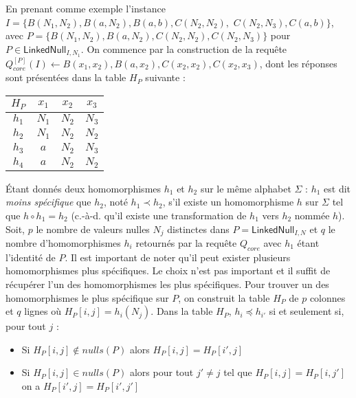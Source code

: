 \begin{example}
	\label{ex:update:core:tableau}
	En prenant comme exemple l'instance $I = \{B(N_1, N_2), B(a, N_2), B(a, b), C(N_2, N_2),$ $C(N_2, N_3), C(a, b)\}$, avec $P = \{B(N_1, N_2), B(a, N_2), C(N_2, N_2), C(N_2, N_3)\}$ pour $P \in \textsf{LinkedNull}_{I,N_1}$.
	On commence par la construction de la requête $Q_{core}^{[P]}(I) \gets B(x_1, x_2), B(a, x_2), C(x_2, x_2), C(x_2, x_3)$, dont les réponses sont présentées dans la table $H_P$ suivante :

	\begin{center}
		\begin{tabular}{c|ccc}
			$H_P$ & $x_1$ & $x_2$ & $x_3$ \\
			\hline
			$h_1$ & $N_1$ & $N_2$ & $N_3$ \\
			$h_2$ & $N_1$ & $N_2$ & $N_2$ \\
			$h_3$ & $a$   & $N_2$ & $N_3$ \\
			$h_4$ & $a$   & $N_2$ & $N_2$ \\
		\end{tabular}
	\end{center}
\end{example}

Étant donnés deux homomorphismes $h_1$ et $h_2$ sur le même alphabet $\Sigma$ : $h_1$ est dit \textit{moins spécifique} que $h_2$, noté $h_1 \prec h_2$, s'il existe un homomorphisme $h$ sur $\Sigma$ tel que $h \circ h_1 = h_2$ (c.-à-d. qu'il existe une transformation de $h_1$ vers $h_2$ nommée $h$).
Soit, $p$ le nombre de valeurs nulles $N_j$ distinctes dans $P = \textsf{LinkedNull}_{I,N}$ et $q$ le nombre d'homomorphismes $h_i$ retournés par la requête $Q_{core}$ avec $h_1$ étant l'identité de $P$.
Il est important de noter qu'il peut exister plusieurs homomorphismes plus spécifiques.
Le choix n'est pas important et il suffit de récupérer l'un des homomorphismes les plus spécifiques.
Pour trouver un des homomorphismes le plus spécifique sur $P$, on construit la table $H_P$ de $p$ colonnes et $q$ lignes où $H_P[i, j] = h_i(N_j)$.
Dans la table $H_P$, $h_i \preceq h_{i'}$ si et seulement si, pour tout $j$ :

\begin{itemize}
	\item Si $H_P[i, j] \notin nulls(P)$ alors $H_P[i, j] = H_P[i', j]$
	\item Si $H_P[i, j] \in nulls(P)$ alors pour tout $j' \neq j$ tel que $H_P[i, j] = H_P[i, j']$ on a $H_P[i', j] = H_P[i', j']$
\end{itemize}

